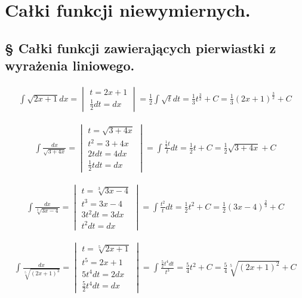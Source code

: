 \section{Całki funkcji niewymiernych.}
\subsection{§ Całki funkcji zawierających pierwiastki z wyrażenia liniowego.}


\begin{gather*}\int \sqrt{2x+1}dx = \begin{vmatrix} t=2x+1 \\ \frac{1}{2}dt=dx \end{vmatrix} = \frac{1}{2} \int \sqrt{t}dt = \frac{1}{3}t^{\frac{3}{2}}+C = \frac{1}{3}(2x+1)^{\frac{3}{2}}+C\end{gather*}


\begin{gather*}\int \frac{dx}{\sqrt{3+4x}} = \begin{vmatrix} t=\sqrt{3+4x} \\ t^2=3+4x \\ 2tdt=4dx \\ \frac{1}{2}tdt=dx \end{vmatrix} = \int \frac{\frac{1}{2}t}{t}dt = \frac{1}{2}t+C = \frac{1}{2}\sqrt{3+4x}+C\end{gather*}

\begin{gather*}\int \frac{dx}{\sqrt[3]{3x-4}} = \begin{vmatrix} t=\sqrt[3]{3x-4} \\ t^3=3x-4 \\ 3t^2dt=3dx \\ t^2dt=dx \end{vmatrix} = \int \frac{t^2}{t}dt = \frac{1}{2}t^2+C = \frac{1}{2}(3x-4)^{\frac{2}{3}}+C\end{gather*}

\begin{gather*}\int \frac{dx}{\sqrt[5]{(2x+1)^3}} = \begin{vmatrix} t=\sqrt[5]{2x+1} \\
t^5=2x+1 \\
5t^4dt=2dx \\
\frac{5}{2}t^4dt=dx \end{vmatrix} = \int \frac{\frac{5}{2}t^4dt}{t^3} = \frac{5}{4}t^2+C = \frac{5}{4}\sqrt[5]{(2x+1)^2}+C\end{gather*}


